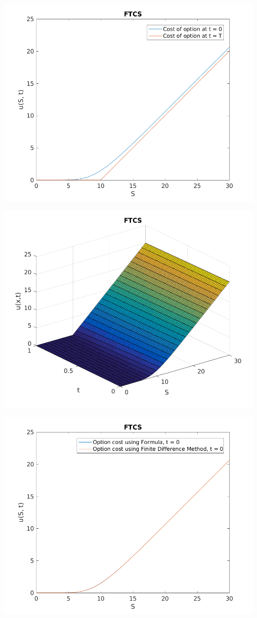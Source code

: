 \documentclass{article}
\begin{document}
\includegraphics{"q1_3"}
\pagebreak


\includegraphics{"q1_4"}
\pagebreak


\includegraphics{"q1_5"}
\pagebreak
\end{document}
